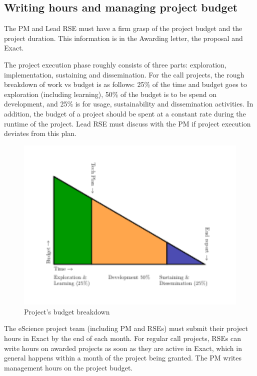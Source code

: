 \subsection{Writing hours and managing project budget}
\label{sec:exec:budget}
The PM and Lead RSE must have a firm grasp of the project budget and the project duration. This information is in the
Awarding letter, the proposal and Exact.

The project execution phase roughly consists of three parts: exploration, implementation, sustaining and dissemination.
For the call projects, the rough breakdown of work vs budget is as follows: 25\% of the time and budget goes to
exploration (including learning), 50\% of the budget is to be spend on development, and 25\% is for usage,
sustainability and dissemination activities. In addition, the budget of a project should be spent at a constant rate
during the runtime of the project. Lead RSE must discuss with the PM if project execution deviates from this plan.

\begin{figure}[!h]
    \centering
    \includegraphics[width=1\textwidth]{img/budget-triangle.pdf}
    \caption{Project's budget breakdown}
    \label{fig:project-budget}
\end{figure}

The eScience project team (including PM and RSEs) must submit their project hours in Exact by the end of each month. For
regular call projects, RSEs can write hours on awarded projects as soon as they are active in Exact, which in general
happens within a month of the project being granted. The PM writes management hours on the project budget.

